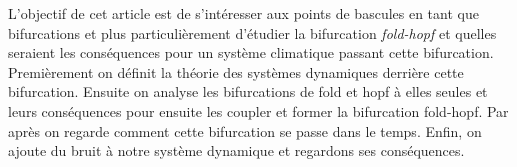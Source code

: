 L'objectif de cet article est de s'intéresser aux points de bascules en tant que bifurcations et plus particulièrement d'étudier la bifurcation \emph{fold-hopf} et quelles seraient les conséquences pour un système climatique passant cette bifurcation. Premièrement on définit la théorie des systèmes dynamiques derrière cette bifurcation. Ensuite on analyse les bifurcations de fold et hopf à elles seules et leurs conséquences pour ensuite les coupler et former la bifurcation fold-hopf. Par après on regarde comment cette bifurcation se passe dans le temps. Enfin, on ajoute du bruit à notre système dynamique et regardons ses conséquences.
